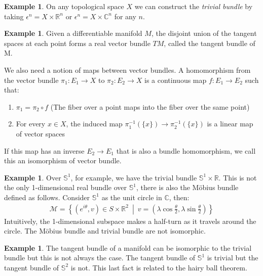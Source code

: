 \documentclass[10pt,a4paper]{article}
\theoremstyle{definition}
\newtheorem{example}[theorem]{Example}
\begin{document}
\begin{example}
On any topological space $X$ we can construct the \emph{trivial bundle} by taking $\epsilon^n = X \times \mathbb{R}^n$ or $\epsilon^n = X \times \mathbb{C}^n$ for any $n$.
\end{example}

\begin{example}
Given a differentiable manifold $M$, the disjoint union of the tangent spaces at each point forms a real vector bundle $TM$, called the tangent bundle of M.
\end{example}

We also need a notion of maps between vector bundles. A homomorphism from the vector bundle $\pi_1 : E_1 \to X$ to $\pi_2 : E_2 \to X$ is a continuous map $f : E_1 \to E_2$ such that:
\begin{enumerate}
\item $\pi_1 = \pi_2 \circ f$ (The fiber over a point maps into the fiber over the same point)
\item For every $x \in X$, the induced map $\pi_1^{-1}(\{x\}) \to \pi_2^{-1}(\{x\})$ is a linear map of vector spaces
\end{enumerate}

If this map has an inverse $E_2 \to E_1$ that is also a bundle homomorphism, we call this an isomorphism of vector bundle.

\begin{example}
Over $\mathbb{S}^1$, for example, we have the trivial bundle $\mathbb{S}^1 \times \mathbb{R}$. This is not the only 1-dimensional real bundle over $\mathbb{S}^1$, there is also the M\"{o}bius bundle defined as follows. Consider $\mathbb{S}^1$ as the unit circle in $\mathbb{C}$, then:
\begin{align*}
\mathcal{M} = \left\{ (e^{i \theta}, v) \in S \times \mathbb{R}^2 \: \middle| \: v = (\lambda \cos{\frac{\theta}{2}}, \lambda \sin{\frac{\theta}{2}}) \right\}
\end{align*}
Intuitively, the 1-dimensional subspace makes a half-turn as it travels around the circle. The M\"{o}bius bundle and trivial bundle are not isomorphic.
\end{example}

\begin{example}
The tangent bundle of a manifold can be isomorphic to the trivial bundle but this is not always the case. The tangent bundle of $\mathbb{S}^1$ is trivial but the tangent bundle of $\mathbb{S}^2$ is not. This last fact is related to the hairy ball theorem.
\end{example}
\end{document}

